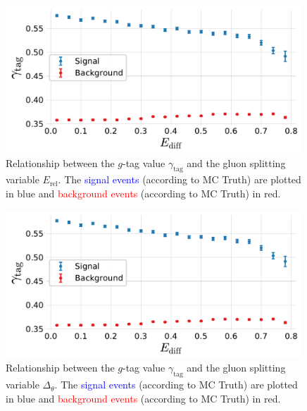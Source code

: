 \begin{figure}
  \centerfloat
  \includegraphics[width=0.99\textwidth, trim=0 0 0 0, clip, page=3]{figures/quarks/gtag-g_splitting_gtag_errorbar-down_sample=1.00-ML_vars=vertex-selection=b-ejet_min=4-n_iter_RS_lgb=99-n_iter_RS_xgb=9-cdot_cut=0.90-version=19-njet=4.pdf}
  \caption[Relationship Between the $g$-Tag Value $\gamma_\mathrm{tag}$ and the Gluon Splitting Variable $E_\mathrm{rel}$]
          {Relationship between the $g$-tag value $\gamma_\mathrm{tag}$ and the gluon splitting variable $E_\mathrm{rel}$. The \textcolor{blue}{signal events} (according to MC Truth) are plotted in blue and \textcolor{red}{background events} (according to MC Truth) in red. 
          } 
  \label{fig:q:gtag_gluon_splitting_variable_E_rel}
\end{figure}
\begin{figure}
  \centerfloat
  \includegraphics[width=0.99\textwidth, trim=0 0 0 0, clip, page=4]{figures/quarks/gtag-g_splitting_gtag_errorbar-down_sample=1.00-ML_vars=vertex-selection=b-ejet_min=4-n_iter_RS_lgb=99-n_iter_RS_xgb=9-cdot_cut=0.90-version=19-njet=4.pdf}
  \caption[Relationship Between the $g$-Tag Value $\gamma_\mathrm{tag}$ and the Gluon Splitting Variable $\Delta_\theta$]
          {Relationship between the $g$-tag value $\gamma_\mathrm{tag}$ and the gluon splitting variable $\Delta_\theta$. The \textcolor{blue}{signal events} (according to MC Truth) are plotted in blue and \textcolor{red}{background events} (according to MC Truth) in red. 
          } 
  \label{fig:q:gtag_gluon_splitting_variable_delta_theta}
\end{figure}
